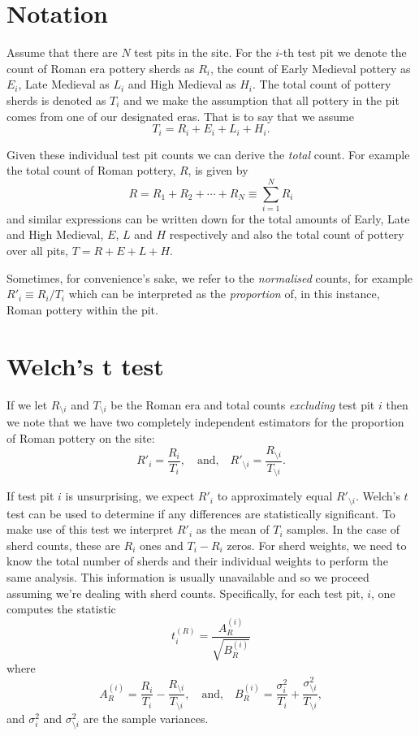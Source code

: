 \documentclass[conference]{IEEEtran}
\begin{document}
\section{Notation}

Assume that there are $N$ test pits in the site. For the $i$-th test pit we
denote the count of Roman era pottery sherds as $R_i$, the count of Early
Medieval pottery as $E_i$, Late Medieval as $L_i$ and High Medieval as $H_i$.
The total count of pottery sherds is denoted as $T_i$ and we make the assumption
that all pottery in the pit comes from one of our designated eras. That is to
say that we assume
\[
    T_i = R_i + E_i + L_i + H_i.
\]

Given these individual test pit counts we can derive the \emph{total} count.
For example the total count of Roman pottery, $R$, is given by
\[
    R = R_1 + R_2 + \cdots + R_N \equiv \sum_{i=1}^N R_i
\]
and similar expressions can be written down for the total amounts of Early, Late
and High Medieval, $E$, $L$ and $H$ respectively and also the total count of
pottery over all pits, $T = R + E + L + H$.

Sometimes, for convenience's sake, we refer to the \emph{normalised} counts,
for example $R'_i \equiv R_i / T_i$ which can be interpreted as the
\emph{proportion} of, in this instance, Roman pottery within the pit.

\section{Welch's t test}

If we let $R_{\setminus i}$ and $T_{\setminus i}$ be the Roman era and total
counts \emph{excluding} test pit $i$ then we note that we have two completely
independent estimators for the proportion of Roman pottery on the site:
\[
    R'_i = \frac{R_i}{T_i}, \quad \mbox{and,} \quad
    R'_{\setminus i} = \frac{R_{\setminus i}}{T_{\setminus i}}.
\]

If test pit $i$ is unsurprising, we expect $R'_i$ to approximately equal
$R'_{\setminus i}$. Welch's $t$ test\cite{welch} can be used to determine if any
differences are statistically significant. To make use of this test we interpret
$R'_i$ as the mean of $T_i$ samples. In the case of sherd counts, these are
$R_i$ ones and $T_i - R_i$ zeros. For sherd weights, we need to know the total
number of sherds and their individual weights to perform the same analysis. This
information is usually unavailable and so we proceed assuming we're dealing with
sherd counts. Specifically, for each test pit, $i$,
one computes the statistic
\[
    t^{(R)}_i = \frac{A^{(i)}_R}{\sqrt{B^{(i)}_R}}
\]
where
\[
    A^{(i)}_R = \frac{R_i}{T_i} - \frac{R_{\setminus i}}{T_{\setminus i}},
    \quad\mbox{and,}\quad
    B^{(i)}_R = \frac{\sigma^2_i}{T_i} +
    \frac{\sigma^2_{\setminus i}}{T_{\setminus i}},
\]
and $\sigma^2_i$ and $\sigma^2_{\setminus i}$ are the sample variances.
\end{document}
